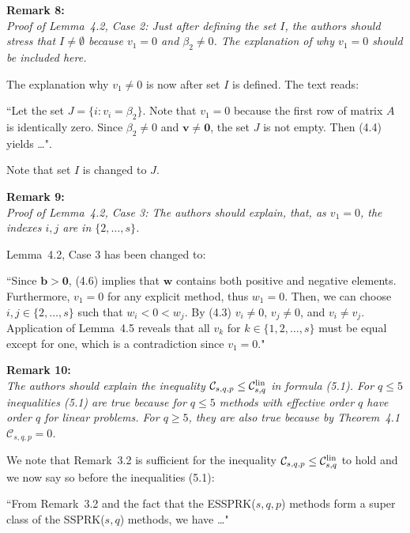 \documentclass[12pt]{article}
\newcommand{\remark}[2]{\vspace{25pt} \noindent \textbf{Remark #1:\newline} \textit{#2}\vspace{15pt}}
\renewcommand{\newline}{\vspace{15pt}\\}
\newcommand{\sspcoef}{\mathcal{C}}
\newcommand{\clin}{\sspcoef^{\textnormal{lin}}_{s,q}}
\begin{document}
\pagebreak

\remark{8}{
Proof of Lemma~4.2, Case 2: Just after defining the set $I$, the authors should stress that
$I \neq \emptyset$ because $v_1 = 0$ and $\beta_2 \neq 0$.
The explanation of why $v_1 = 0$ should be included
here.}

The explanation why $v_1 \neq 0$ is now after set $I$ is defined. The text reads:

``Let the set $J = \{i : v_i = \beta_2\}$. 
Note that $v_1 = 0$ because the first row of matrix $A$ is identically zero.
Since $\beta_2 \neq 0$ and $ \bm{v} \neq \bm{0}$, the set $J$ is not empty.
Then (4.4) yields \dots".

Note that set $I$ is changed to $J$.
	
\remark{9}{
Proof of Lemma~4.2, Case 3: The authors should explain, that, as $v_1 = 0$, the 
indexes $i,j$ are in $\{2,\dots,s\}$.}

Lemma~4.2, Case 3 has been changed to:

``Since $\bm{b} > \bm{0}$, (4.6) implies that $\bm{w}$ contains both positive 
and negative elements. 
Furthermore, $v_1=0$ for any explicit method, thus $w_1=0$.
Then, we can choose $i, j \in \{2, \dots, s\}$ such that $w_i < 0 < w_j$.
By (4.3) $v_i\ne 0$, $v_j\ne 0$, and $v_i\ne v_j$.
Application of Lemma~4.5 reveals that all $v_k$ for 
$k \in\{1,2,\dots,s\}$ must be equal except for one, which is a contradiction
since $v_1 = 0$."

\remark{10}{
The authors should explain the inequality $\sspcoef_{s,q,p} \leq \clin$ in formula (5.1). 
For $q \leq 5$ inequalities (5.1) are true because for $q \leq 5$ methods with effective 
order $q$ have order $q$ for linear problems. 
For $q \geq 5$, they are also true because by Theorem~4.1 $\sspcoef_{s,q,p}  = 0$.}

We note that Remark~3.2 is sufficient for the inequality 
$\sspcoef_{s,q,p} \leq \clin$ to hold and we now say so before the inequalities (5.1):

``From Remark~3.2 and the fact that the ESSPRK($s,q,p$) methods 
form a super class of the SSPRK($s,q$) methods, we have \dots"
\end{document}

